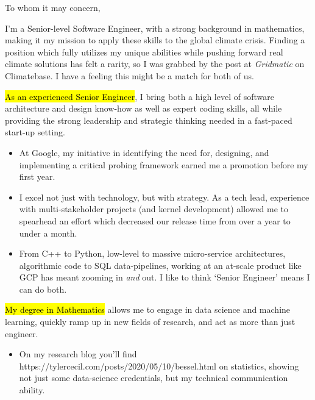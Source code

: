 \documentclass{tc_cv}
\begin{document}

\begin{adjustwidth}{40pt}{40pt}
  \large

  To whom it may concern, \par \bigskip

  I'm a Senior-level Software Engineer, with a strong background in
  mathematics, making it my mission to apply these skills to the global climate
  crisis. Finding a position which fully utilizes my unique abilities while
  pushing forward real climate solutions has felt a rarity, so I was grabbed by
  the post at \emph{Gridmatic} on Climatebase. I have a feeling this might be a
  match for both of us. \medbreak

  \hl{As an experienced Senior Engineer}, I bring both a high level of software
  architecture and design know-how as well as expert coding skills, all while
  providing the strong leadership and strategic thinking needed in a fast-paced
  start-up setting.
  \begin{itemize}

    \item At Google, my initiative in identifying the need for, designing, and
      implementing a critical probing framework earned me a promotion before my
      first year.

    \item I excel not just with technology, but with strategy. As a tech lead,
      experience with multi-stakeholder projects (and kernel development)
      allowed me to spearhead an effort which decreased our release time from
      over a year to under a month.

    \item From C++ to Python, low-level to massive micro-service architectures,
      algorithmic code to SQL data-pipelines, working at an at-scale product
      like GCP has meant zooming in \emph{and} out. I like to think `Senior
      Engineer' means I can do both.

  \end{itemize} \medskip

  \hl{My degree in Mathematics} allows me to engage in data science and machine
  learning, quickly ramp up in new fields of research, and act as more than
  just engineer.
  \begin{itemize}

    \item On my research blog you'll find \cite{Jupyter
      notebooks}{https://tylercecil.com/posts/2020/05/10/bessel.html} on
      statistics, showing not just some data-science credentials, but my
      technical communication ability.


\end{itemize}
\end{adjustwidth}
\end{document}
